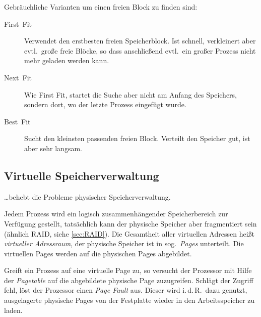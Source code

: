 Gebräuchliche Varianten um einen freien Block zu finden sind:
\begin{description}
  \item [{First~Fit}] 
	Verwendet den erstbesten freien Speicherblock.
	Ist schnell, verkleinert aber evtl.~große freie Blöcke, so dass anschließend evtl.~ein großer Prozess nicht mehr geladen werden kann.
  \item [{Next~Fit}] 
	Wie First Fit, startet die Suche aber nicht am Anfang des Speichers, sondern dort, wo der letzte Prozess eingefügt wurde.
  \item [{Best~Fit}] 
	Sucht den kleinsten passenden freien Block. Verteilt den Speicher gut, ist aber sehr langsam.
\end{description}

\subsection{\label{sub:Virtuelle-Speicherverwaltung}Virtuelle Speicherverwaltung}

\ldots{}behebt die Probleme physischer Speicherverwaltung.

Jedem Prozess wird ein logisch zusammenhängender Speicherbereich zur Verfügung gestellt, tatsächlich kann der physische Speicher aber fragmentiert sein (ähnlich RAID, siehe \cref{sec:RAID}).
Die Gesamtheit aller virtuellen Adressen heißt \emph{virtueller Adressraum}, der physische Speicher ist in sog.~\emph{Pages} unterteilt.
Die virtuellen Pages werden auf die physischen Pages abgebildet.

Greift ein Prozess auf eine virtuelle Page zu, so versucht der Prozessor mit Hilfe der \emph{Pagetable} auf die abgebildete physische Page zuzugreifen.
Schlägt der Zugriff fehl, löst der Prozessor einen \emph{Page Fault} aus.
Dieser wird i.\,d.\,R.~dazu genutzt, ausgelagerte physische Pages von der Festplatte wieder in den Arbeitsspeicher zu laden.


